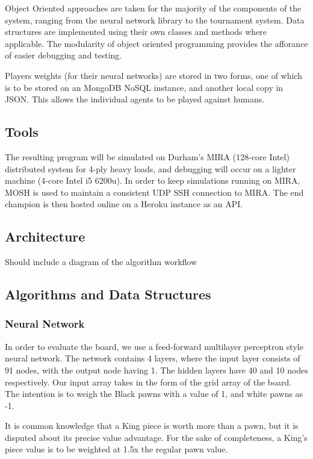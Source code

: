 \documentclass[12pt,a4paper]{article}
\begin{document}
Object Oriented approaches are taken for the majority of the components of the system, ranging from the neural network library to the tournament system. Data structures are implemented using their own classes and methods where applicable. The modularity of object oriented programming provides the afforance of easier debugging and testing.

Players weights (for their neural networks) are stored in two forms, one of which is to be stored on an MongoDB NoSQL instance, and another local copy in JSON. This allows the individual agents to be played against humans.

\subsection*{Tools}

The resulting program will be simulated on Durham's MIRA (128-core Intel) distributed system for 4-ply heavy loads, and debugging will occur on a lighter machine (4-core Intel i5 6200u). In order to keep simulations running on MIRA, MOSH is used to maintain a consistent UDP SSH connection to MIRA. The end champion is then hosted online on a Heroku instance as an API.

\subsection*{Architecture}

Should include a diagram of the algorithm workflow


\subsection*{Algorithms and Data Structures}


\subsubsection{Neural Network}

In order to evaluate the board, we use a feed-forward multilayer perceptron style neural network. The network contains 4 layers, where the input layer consists of 91 nodes, with the output node having 1. The hidden layers have 40 and 10 nodes respectively. Our input array takes in the form of the grid array of the board. The intention is to weigh the Black pawns with a value of 1, and white pawns as -1. 

It is common knowledge that a King piece is worth more than a pawn, but it is disputed about its precise value advantage. For the sake of completeness, a King's piece value is to be weighted at 1.5x the regular pawn value. 
\end{document}

